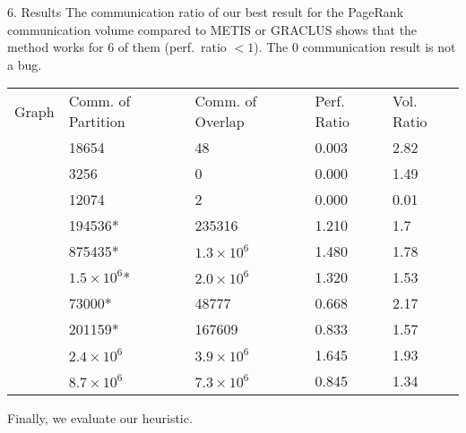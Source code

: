 \documentclass[final,hyperref={pdfpagelabels=true},t]{beamer}
\begin{document}
\begin{frame}
\begin{columns}
\begin{block}{6. Results}
The communication ratio of our best
result for the PageRank communication volume compared to 
{\small \textsc{METIS}} or {\small \textsc{GRACLUS}} shows
that the method works for 6 of them (perf.~ratio $< 1$).
The 0 communication result is not a bug.
\begin{center}
\footnotesize
\begin{tabularx}{0.9\linewidth}{lVVVV}
 \rule{0pt}{2.5ex} Graph & Comm. of Partition  & Comm. of Overlap  & Perf. Ratio & Vol. Ratio \\
    & 18654  & 48  & 0.003 & 2.82   \\
   & 3256 & 0 & 0.000 & 1.49   \\
   & 12074  & 2 & 0.000 & 0.01   \\
   & 194536* & 235316  & 1.210 & 1.7  \\
  & 875435* & ${1.3 \times 10^6}$ & 1.480 & 1.78   \\
  & $1.5 \times 10^{6}$*   & ${2.0 \times 10^6}$ & 1.320 & 1.53\\
  & 73000*  & 48777 & 0.668 & 2.17   \\
  & 201159*  & 167609  & 0.833 & 1.57  \\
  & $2.4 \times 10^{6}$ & ${3.9 \times 10^6}$ & 1.645 & 1.93   \\
   & $8.7 \times 10^{6}$ & ${7.3 \times 10^6}$ & 0.845 & 1.34 \\
 \end{tabularx}
\end{center}

Finally, we evaluate our heuristic.
\vspace{-1.5ex}


\end{block}
\end{columns}
\end{frame}
\end{document}
